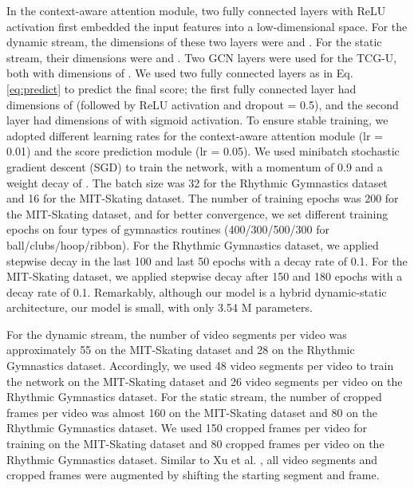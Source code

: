 \documentclass[sigconf]{acmart}
\begin{document}
In the context-aware attention module, two fully connected layers with ReLU activation first embedded the input features into a low-dimensional space. For the dynamic stream, the dimensions of these two layers were  and . For the static stream, their dimensions were  and . Two GCN layers were used for the TCG-U, both with dimensions of . We used two fully connected layers as  in Eq. \ref{eq:predict} to predict the final score; the first fully connected layer had dimensions of  (followed by ReLU activation and dropout = 0.5), and the second layer had dimensions of  with sigmoid activation. To ensure stable training, we adopted different learning rates for the context-aware attention module (lr = 0.01) and the score prediction module (lr = 0.05). We used minibatch stochastic gradient descent (SGD) to train the network, with a momentum of 0.9 and a weight decay of . The batch size was 32 for the Rhythmic Gymnastics dataset and 16 for the MIT-Skating dataset. The number of training epochs was 200 for the MIT-Skating dataset, and for better convergence, we set different training epochs on four types of gymnastics routines (400/300/500/300 for ball/clubs/hoop/ribbon). For the Rhythmic Gymnastics dataset, we applied stepwise decay in the last 100 and last 50 epochs with a decay rate of 0.1. For the MIT-Skating dataset, we applied stepwise decay after 150 and 180 epochs with a decay rate of 0.1. Remarkably, although our model is a hybrid dynamic-static architecture, our model is small, with only 3.54 M parameters.

\vspace{5pt}

For the dynamic stream, the number of video segments per video was approximately 55 on the MIT-Skating dataset and 28 on the Rhythmic Gymnastics dataset. Accordingly, we used 48 video segments per video to train the network on the MIT-Skating dataset and 26 video segments per video on the Rhythmic Gymnastics dataset. For the static stream, the number of cropped frames per video was almost 160 on the MIT-Skating dataset and 80 on the Rhythmic Gymnastics dataset. We used 150 cropped frames per video for training on the MIT-Skating dataset and 80 cropped frames per video on the Rhythmic Gymnastics dataset. Similar to Xu et al. \cite{xu2019learning}, all video segments and cropped frames were augmented by shifting the starting segment and frame.

\vspace{5pt}
\end{document}
